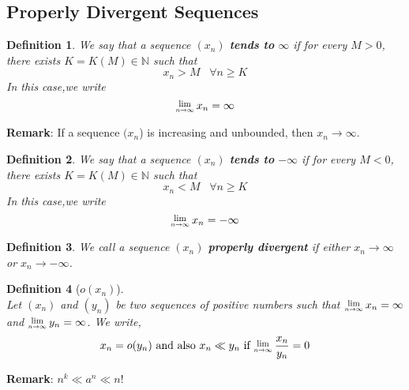 \documentclass[12pt]{article}
\newcommand{\Lim}[1]{\raisebox{0.5ex}{\scalebox{0.8}{$\displaystyle \lim_{#1}\;$}}}
\newtheorem{definition}{Definition}[section]
\theoremstyle{definition}
\begin{document}
\subsection{Properly Divergent Sequences}
\begin{definition}\normalfont We say that a sequence $(x_n)$ \textbf{tends to} $\infty$ if for every $M>0$, there exists $K=K(M)\in\mathbb{N}$ such that
\[
x_n>M\;\;\;\forall n\geq K
\]
In this case,we write
\[
\Lim{n\to\infty} x_n = \infty
\]
\end{definition}
\textbf{Remark}: If a sequence $(x_n$) is increasing and unbounded, then $x_n\to\infty$.
\begin{definition}\normalfont We say that a sequence $(x_n)$ \textbf{tends to} $-\infty$ if for every $M<0$, there exists $K=K(M)\in\mathbb{N}$ such that
\[
x_n<M\;\;\;\forall n\geq K
\]
In this case,we write
\[
\Lim{n\to\infty} x_n = -\infty
\]
\end{definition}
\begin{definition}\normalfont We call a sequence $(x_n)$ \textbf{properly divergent} if either $x_n\to\infty$ or $x_n\to -\infty$.
\end{definition}
\begin{definition}[$o(x_n)$]
\hfill\\\normalfont Let $(x_n)$ and $(y_n)$ be two sequences of positive numbers such that $\Lim{n\to\infty}x_n=\infty$ and $\Lim{n\to\infty} y_n=\infty$. We write,
\[
x_n=o(y_n) \text{ and also }x_n\ll y_n\text{ if }\Lim{n\to\infty}\frac{x_n}{y_n}=0 
\] 
\end{definition}
\textbf{Remark}: $n^k\ll a^n\ll n!$
\clearpage
\end{document}
